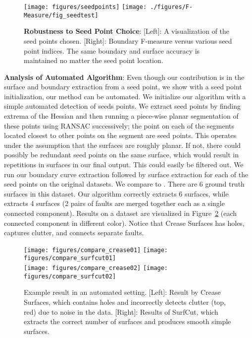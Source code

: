 \documentclass[10pt,journal,compsoc]{IEEEtran}
\newcommand{\comment}[1]{ }
\begin{document}
\begin{figure}
  \centering
  \texttt{[image: figures/seedpoints]}
  \texttt{[image: ./figures/F-Measure/fig\_seedtest]}
  \caption{{\bf Robustness to Seed Point Choice}: [Left]: A
    visualization of the seed points chosen.  [Right]: Boundary
    F-measure versus various seed point indices. The same boundary and
    surface accuracy is maintained no matter the seed point location.}
  \label{fig:seedpoint_robust}
\end{figure}




{\bf Analysis of Automated Algorithm}: Even though our contribution is
in the surface and boundary extraction from a seed point, we show with
a seed point initialization, our method can be automated. We
initialize our algorithm with a simple automated detection of seeds
points. We extract seed points by finding extrema of the Hessian and
then running a piece-wise planar segmentation of these points using
RANSAC \cite{rusu20113d} successively; the point on each of the
segments located closest to other points on the segment are seed
points. This operates under the assumption that the surfaces are
roughly planar.  If not, there could possibly be redundant seed points
on the same surface, which would result in repetitions in surfaces in
our final output. This could easily be filtered out.  We run our
boundary curve extraction followed by surface extraction for each of
the seed points on the original datasets. We compare to
\cite{schultz2010crease}. There are 6 ground truth surfaces in this
dataset. Our algorithm correctly extracts 6 surfaces, while
\cite{schultz2010crease} extracts 4 surfaces (2 pairs of faults are
merged together each as a single connected component). Results on a
dataset are visualized in Figure~\ref{fig:fully_automated_results}
(each connected component in different color). Notice that Crease
Surfaces has holes, captures clutter, and connects separate faults.

\begin{figure}
  \centering
  \texttt{[image: figures/compare\_crease01]}
  \texttt{[image: figures/compare\_surfcut01]} \vspace{0.05in} \\%
  \texttt{[image: figures/compare\_crease02]}
  \texttt{[image: figures/compare\_surfcut02]}
  \caption{Example result in an automated setting. [Left]: Result by
    Crease Surfaces, which contains holes and incorrectly detects
    clutter (top, red) due to noise in the data. [Right]: Results of
    SurfCut, which extracts the correct number of surfaces and
    produces smooth simple surfaces. \comment{ ({\bf See Supplementary
        Material for video and further visual validation.}) } }
  \label{fig:fully_automated_results}
\end{figure}
\end{document}

